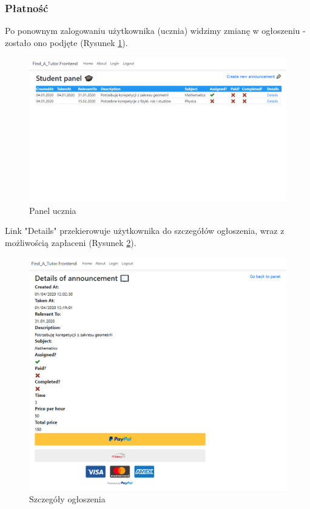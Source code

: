 \documentclass[12pt]{article}
\numberwithin{figure}{section}
\begin{document}
\begin{sloppypar}
\subsubsection{Płatność}
Po ponownym zalogowaniu użytkownika (ucznia) widzimy zmianę w ogłoszeniu - zostało ono podjęte (Rysunek \ref{fig:student-assigned}).
\begin{figure}[H] 
    \centering
    \includegraphics[width=1\textwidth]{images/chapter_4/student-assigned.png}
    \caption{Panel ucznia}
    \label{fig:student-assigned}
\end{figure}

Link "Details" przekierowuje użytkownika do szczegółów ogłoszenia, wraz z możliwością zapłaceni (Rysunek \ref{fig:details}). 
\begin{figure}[H] 
    \centering
    \includegraphics[width=1\textwidth]{images/chapter_4/details.png}
    \caption{Szczegóły ogłoszenia}
    \label{fig:details}
\end{figure}


\end{sloppypar}
\end{document}
